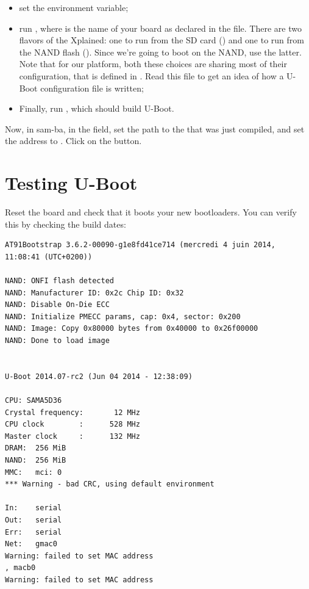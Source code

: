 \begin{itemize}

\item set the  environment variable;

\item run , where  is the name
  of your board as declared in the  file. There are
  two flavors of the Xplained: one to run from the SD card
  () and one to run from the NAND flash
  (). Since we're going to boot on
  the NAND, use the latter. Note that for our platform, both these
  choices are sharing most of their configuration, that is defined in
  . Read this file to get an
  idea of how a U-Boot configuration file is written;

\item Finally, run , which should build U-Boot.

\end{itemize}

Now, in sam-ba, in the  field, set the path to
the  that was just compiled, and set the address to
. Click on the  button.

\section{Testing U-Boot}

Reset the board and check that it boots your new bootloaders. You can
verify this by checking the build dates:

\begin{verbatim}
AT91Bootstrap 3.6.2-00090-g1e8fd41ce714 (mercredi 4 juin 2014, 11:08:41 (UTC+0200))

NAND: ONFI flash detected
NAND: Manufacturer ID: 0x2c Chip ID: 0x32
NAND: Disable On-Die ECC
NAND: Initialize PMECC params, cap: 0x4, sector: 0x200
NAND: Image: Copy 0x80000 bytes from 0x40000 to 0x26f00000
NAND: Done to load image


U-Boot 2014.07-rc2 (Jun 04 2014 - 12:38:09)

CPU: SAMA5D36
Crystal frequency:       12 MHz
CPU clock        :      528 MHz
Master clock     :      132 MHz
DRAM:  256 MiB
NAND:  256 MiB
MMC:   mci: 0
*** Warning - bad CRC, using default environment

In:    serial
Out:   serial
Err:   serial
Net:   gmac0
Warning: failed to set MAC address
, macb0
Warning: failed to set MAC address
\end{verbatim}

